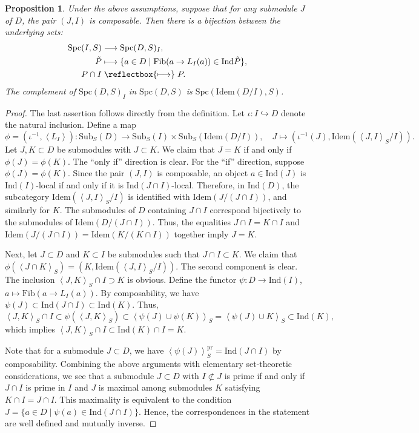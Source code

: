 \documentclass[11pt]{amsart}
\theoremstyle{definition}
\theoremstyle{plain}
\newtheorem{prop}[defn]{Proposition}
\theoremstyle{remark}
\newcommand{\Idem}{\mathrm{Idem}}
\newcommand{\Ind}{\mathrm{Ind}}
\newcommand{\Sub}{\mathrm{Sub}}
\newcommand{\mo}{\mathrm}
\newcommand{\ang}[1]{{\left\langle{#1}\right\rangle}}
\newcommand{\Fib}{\mathrm{Fib}}
\newcommand{\Spc}{\mathrm{Spc}}
\newcommand{\mapsfrom}{\mathrel{\reflectbox{\ensuremath{\longmapsto}}}}
\numberwithin{equation}{section}
\begin{document}
\begin{prop}\label{prop:composability_and_spaces}
Under the above assumptions, suppose that for any submodule \(J\) of \(D\), the pair \((J,I)\) is composable.
Then there is a bijection between the underlying sets:
\begin{align*}
\Spc(I,S)&\longrightarrow \Spc(D,S)_I,\\
\tilde{P}&\longmapsto \{a\in D\mid \Fib(a\to L_I(a))\in \Ind \tilde{P}\},\\
P\cap I&\mapsfrom P.
\end{align*}
The complement of \(\Spc(D,S)_I\) in \(\Spc(D,S)\) is \(\Spc(\Idem(D/I),S)\).
\end{prop}
\begin{proof}
The last assertion follows directly from the definition.
Let \(\iota:I\hookrightarrow D\) denote the natural inclusion.
Define a map
\[
\phi=(\iota^{-1},\ang{L_I}):\Sub_S(D)\longrightarrow \Sub_S(I)\times \Sub_S(\Idem(D/I)),\quad
J\longmapsto (\iota^{-1}(J), \Idem(\ang{J,I}_S/I)).
\]
Let \(J,K\subset D\) be submodules with \(J\subset K\).
We claim that \(J=K\) if and only if \(\phi(J)=\phi(K)\).
The “only if” direction is clear.
For the “if” direction, suppose \(\phi(J)=\phi(K)\).
Since the pair \((J, I)\) is composable, an object \(a \in \Ind(J)\) is \(\Ind(I)\)-local if and only if it is \(\Ind(J \cap I)\)-local.  
Therefore, in \(\Ind(D)\), the subcategory \(\Idem(\ang{J, I}_S/I)\) is identified with \(\Idem(J/(J \cap I))\), and similarly for \(K\).
The submodules of \(D\) containing \(J \cap I\) correspond bijectively to the submodules of \(\Idem(D/(J \cap I))\).  
Thus, the equalities \(J \cap I = K \cap I\) and \(\Idem(J/(J \cap I)) = \Idem(K/(K \cap I))\) together imply \(J = K\).

Next, let \(J\subset D\) and \(K\subset I\) be submodules such that \(J \cap I\subset K\).
We claim that \(\phi(\ang{J\cap K}_S)=(K,\Idem(\ang{J,I}_S/I))\).
The second component is clear.
The inclusion \(\ang{J,K}_S\cap I\supset K\) is obvious.
Define the functor \(\psi:D\to \Ind(I)\), \(a\mapsto \Fib(a\to L_I(a))\).
By composability, we have \(\psi(J)\subset\Ind(J\cap I)\subset \Ind(K)\).
Thus,
\[
\ang{J,K}_{S}\cap I
  \subset \psi(\ang{J,K}_{S})
  \subset \ang{\psi(J)\cup\psi(K)}_{S}
  = \ang{\psi(J)\cup K}_{S}
  \subset \Ind(K),
\]
which implies \(\ang{J,K}_S\cap I\subset \Ind(K)\cap I=K\).

Note that for a submodule \(J\subset D\), we have \(\ang{\psi(J)}^{\mo{pr}}_S=\Ind(J\cap I)\) by composability.  
Combining the above arguments with elementary set-theoretic considerations, we see that a submodule \(J\subset D\) with \(I\not\subset J\) is prime if and only if \(J\cap I\) is prime in \(I\) and \(J\) is maximal among submodules \(K\) satisfying \(K\cap I=J\cap I\).  
This maximality is equivalent to the condition \(J=\{a\in D \mid \psi(a)\in \Ind(J\cap I)\}\).
Hence, the correspondences in the statement are well defined and mutually inverse.
\end{proof}
\end{document}
